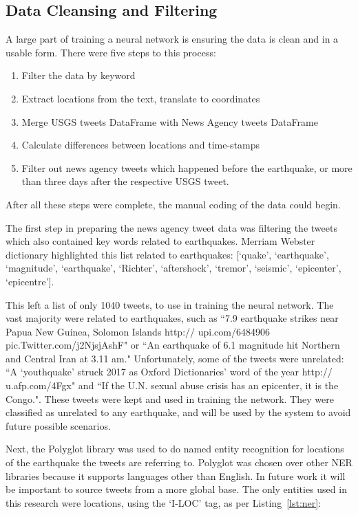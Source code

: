 \subsection{Data Cleansing and Filtering}

A large part of training a neural network is ensuring the data is clean and in a usable form\cite{LeCun_backprop}. There were five steps to this process:

\begin{enumerate}
    \item Filter the data by keyword
    \item Extract locations from the text, translate to coordinates
    \item Merge USGS tweets DataFrame with News Agency tweets DataFrame
    \item Calculate differences between locations and time-stamps
    \item Filter out news agency tweets which happened before the earthquake, or more than three days after the respective USGS tweet.
\end{enumerate}

After all these steps were complete, the manual coding of the data could begin.

The first step in preparing the news agency tweet data was filtering the tweets which also contained key words related to earthquakes. Merriam Webster dictionary highlighted this list related to earthquakes: [`quake', `earthquake', `magnitude', `earthquake', `Richter', `aftershock', `tremor', `seismic', `epicenter', `epicentre']\cite{MerriamWebster2009}.

This left a list of only 1040 tweets, to use in training the neural network. The vast majority were related to earthquakes, such as ``7.9 earthquake strikes near Papua New Guinea, Solomon Islands http:// upi.com/6484906 pic.Twitter.com/j2NjsjAshF" or ``An earthquake of 6.1 magnitude hit Northern and Central Iran at 3.11 am." Unfortunately, some of the tweets were unrelated: ``A `youthquake' struck 2017 as Oxford Dictionaries' word of the year http:// u.afp.com/4Fgx" and ``If the U.N. sexual abuse crisis has an epicenter, it is the Congo.". These tweets were kept and used in training the network. They were classified as unrelated to any earthquake, and will be used by the system to avoid future possible scenarios.

Next, the Polyglot library was used to do named entity recognition for locations of the earthquake the tweets are referring to\cite{polyglotner}. Polyglot was chosen over other NER libraries because it supports languages other than English. In future work it will be important to source tweets from a more global base. The only entities used in this research were locations, using the `I-LOC' tag, as per Listing~\ref{lst:ner}:

